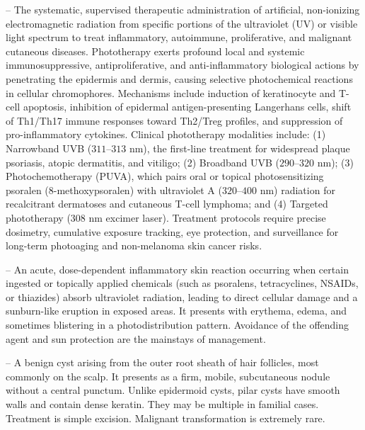 -- The systematic, supervised therapeutic administration of artificial, non-ionizing electromagnetic radiation from specific portions of the ultraviolet (UV) or visible light spectrum to treat inflammatory, autoimmune, proliferative, and malignant cutaneous diseases. Phototherapy exerts profound local and systemic immunosuppressive, antiproliferative, and anti-inflammatory biological actions by penetrating the epidermis and dermis, causing selective photochemical reactions in cellular chromophores. Mechanisms include induction of keratinocyte and T-cell apoptosis, inhibition of epidermal antigen-presenting Langerhans cells, shift of Th1/Th17 immune responses toward Th2/Treg profiles, and suppression of pro-inflammatory cytokines. Clinical phototherapy modalities include: (1) Narrowband UVB ($311\text{--}313\text{ nm}$), the first-line treatment for widespread plaque psoriasis, atopic dermatitis, and vitiligo; (2) Broadband UVB ($290\text{--}320\text{ nm}$); (3) Photochemotherapy (PUVA), which pairs oral or topical photosensitizing psoralen (8-methoxypsoralen) with ultraviolet A ($320\text{--}400\text{ nm}$) radiation for recalcitrant dermatoses and cutaneous T-cell lymphoma; and (4) Targeted phototherapy (308 nm excimer laser). Treatment protocols require precise dosimetry, cumulative exposure tracking, eye protection, and surveillance for long-term photoaging and non-melanoma skin cancer risks.

-- An acute, dose-dependent inflammatory skin reaction occurring when certain ingested or topically applied chemicals (such as psoralens, tetracyclines, NSAIDs, or thiazides) absorb ultraviolet radiation, leading to direct cellular damage and a sunburn-like eruption in exposed areas. It presents with erythema, edema, and sometimes blistering in a photodistribution pattern. Avoidance of the offending agent and sun protection are the mainstays of management.

-- A benign cyst arising from the outer root sheath of hair follicles, most commonly on the scalp. It presents as a firm, mobile, subcutaneous nodule without a central punctum. Unlike epidermoid cysts, pilar cysts have smooth walls and contain dense keratin. They may be multiple in familial cases. Treatment is simple excision. Malignant transformation is extremely rare.

